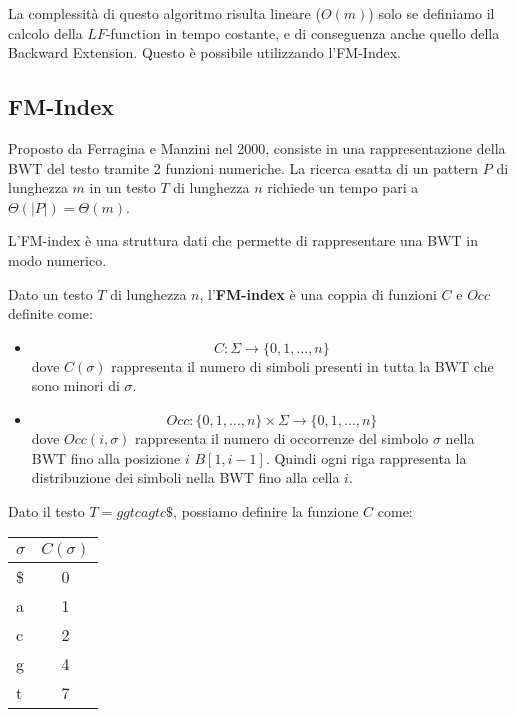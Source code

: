 La complessità di questo algoritmo risulta lineare ($O(m)$) solo se definiamo il
calcolo della $LF$-function in tempo costante, e di conseguenza anche quello della
Backward Extension. Questo è possibile utilizzando l'FM-Index.
\subsection{FM-Index}
Proposto da Ferragina e Manzini nel 2000, consiste in una rappresentazione della
BWT del testo tramite 2 funzioni numeriche. La ricerca esatta di un pattern $P$
di lunghezza $m$ in un testo $T$ di lunghezza $n$ richiede un tempo pari a
$\Theta(|P|) = \Theta(m)$.

L'FM-index è una struttura dati che permette di rappresentare una BWT in modo
numerico.
\begin{definizione}
    Dato un testo $T$ di lunghezza $n$, l'\textbf{FM-index} è una coppia di
    funzioni $C$ e $Occ$ definite come:
    \begin{itemize}
        \item \begin{equation}
                  C: \Sigma \to \{0, 1, \dots, n\}
              \end{equation}
              dove $C(\sigma)$ rappresenta il numero di simboli presenti in tutta
              la BWT che sono minori di $\sigma$.
        \item \begin{equation}
                  Occ: \{0, 1, \dots, n\} \times \Sigma \to \{0, 1, \dots, n\}
              \end{equation}
              dove $Occ(i, \sigma)$ rappresenta il numero di occorrenze del
              simbolo $\sigma$ nella BWT fino alla posizione $i$ $B[1, i - 1]$.
              Quindi ogni riga rappresenta la distribuzione dei simboli nella BWT
              fino alla cella $i$.
    \end{itemize}
\end{definizione}
\begin{esempio}
    Dato il testo $T = ggtcagtc\$$, possiamo definire la funzione $C$ come:
    \begin{table}[!ht]
        \centering
        \begin{tabular}{|l|c|}
            \hline
            \rowcolor[HTML]{EFEFEF}
            \textbf{$\sigma$} & \textbf{$C(\sigma)$} \\ \hline
            \$                & 0                    \\ \hline
            a                 & 1                    \\ \hline
            c                 & 2                    \\ \hline
            g                 & 4                    \\ \hline
            t                 & 7                    \\ \hline
        \end{tabular}
    \end{table}
\end{esempio}
